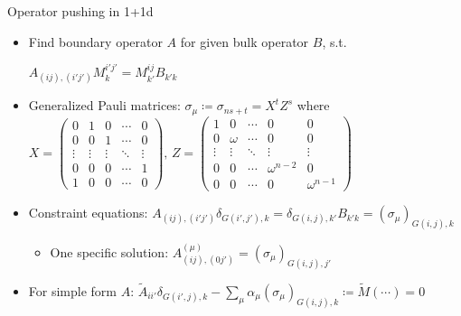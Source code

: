 \documentclass{fdubeamer}
\newcommand{\tikzinput}[1]{}
\newcommand{\1}{\mathbb{1}}
\begin{document}
\begin{frame}{Operator pushing in 1+1d}

\linespread{1.4}
\selectfont

\begin{itemize}
  \item Find boundary operator $A$ for given bulk operator $B$, s.t. \\[0.8ex]
    \mbox{\qquad}
    \begingroup
      \scriptsize
      \tikzset{x=1em, y=1em, node font=\tiny}
      \tikzinput{operator-pushing/constraint-1+1d}
    \endgroup
    \quad\textrightarrow\quad
    $A_{(ij), (i'j')} M^{i'j'}_{ k} = M^{ij}_{k'} B_{k'k}$
  \item Generalized Pauli matrices: $\sigma_\mu \coloneq \sigma_{ns+t} = X^t Z^s$ where \\[1ex]
    \mbox{\qquad}
    $
      X = \left( \begin{smallmatrix}
        0      & 1      & 0      & \cdots & 0      \\
        0      & 0      & 1      & \cdots & 0      \\
        \vdots & \vdots & \vdots & \ddots & \vdots \\
        0      & 0      & 0      & \cdots & 1      \\
        1      & 0      & 0      & \cdots & 0
      \end{smallmatrix} \right)\!, \,
      Z = \left( \begin{smallmatrix}
        1      & 0      & \cdots & 0            & 0      \\
        0      & \omega & \cdots & 0            & 0      \\
        \vdots & \vdots & \ddots & \vdots       & \vdots \\
        0      & 0      & \cdots & \omega^{n-2} & 0      \\
        0      & 0      & \cdots & 0            & \omega^{n-1}
      \end{smallmatrix} \right)
    $
    \vspace{0.5ex}
  \item Constraint equations: $A_{(ij), (i'j')} \delta_{G(i',j'), k} = \delta_{G(i,j), k'} B_{k'k} = (\sigma_\mu)_{G(i,j), k}$

    \begin{itemize}
      \item One specific solution: $A^{(\mu)}_{(ij), (0j')} = (\sigma_\mu)_{G(i,j), j'}$
    \end{itemize}

  \item For simple form $A$: $\tilde{A}_{ii'} \delta_{G(i',j), k} - \sum_\mu \alpha_\mu (\sigma_\mu)_{G(i,j), k} \coloneq \tilde{M}(\cdots) = 0$
\end{itemize}

\end{frame}
\end{document}
